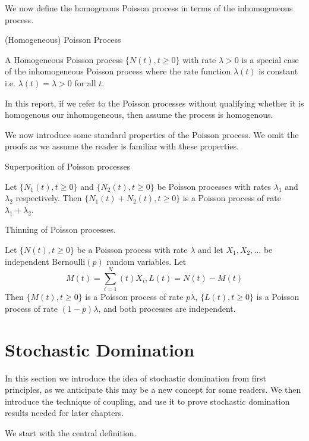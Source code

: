 We now define the homogenous Poisson process in terms of the inhomogeneous process.

\begin{definition}
	(Homogeneous) Poisson Process

	\noindent
	A Homogeneous Poisson process $\{N(t), t \geq 0\}$ with rate $\lambda > 0$ is a special case of the inhomogeneous Poisson process where the rate function $\lambda(t)$ is constant i.e. $\lambda(t)=\lambda > 0$ for all $t$.
\end{definition}

In this report, if we refer to the Poisson processes without qualifying whether it is homogenous our inhomogeneous, then assume the process is homogenous.

We now introduce some standard properties of the Poisson process. We omit the proofs as we assume the reader is familiar with these properties.

\begin{theorem}
	Superposition of Poisson processes

	\noindent
	Let $\{N_1(t), t \geq 0\}$ and $\{N_2(t), t \geq 0\}$ be Poisson processes with rates $\lambda_1$ and $\lambda_2$ respectively. Then $\{N_1(t) + N_2(t), t \geq 0\}$ is a Poisson process of rate $\lambda_1 + \lambda_2$.
\end{theorem}

\begin{theorem}
	Thinning of Poisson processes.

	\noindent
	Let $\{N(t), t \geq 0\}$ be a Poisson process with rate $\lambda$ and let $X_1, X_2, \dots$ be independent $\text{Bernoulli}(p)$ random variables. Let
	$$
		M(t) = \sum_{i=1}^N(t) X_i, L(t) = N(t) - M(t)
	$$
	Then $\{M(t), t \geq 0\}$ is a Poisson process of rate $p\lambda$, $\{L(t), t \geq 0\}$ is a Poisson process of rate $(1-p)\lambda$, and both processes are independent.
\end{theorem}

\section{Stochastic Domination}

In this section we introduce the idea of stochastic domination from first principles, as we anticipate this may be a new concept for some readers. We then introduce the technique of coupling, and use it to prove stochastic domination results needed for later chapters.

We start with the central definition.

